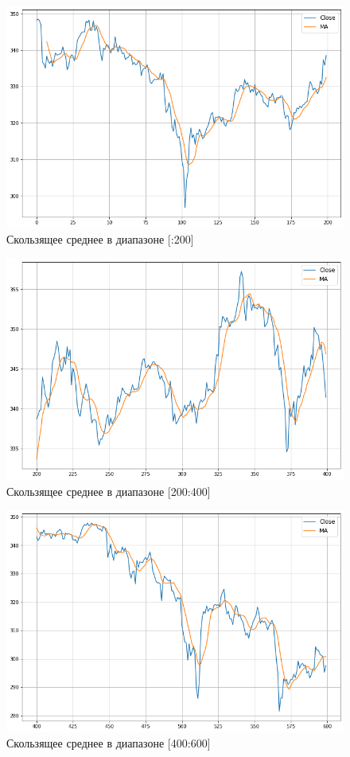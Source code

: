 \documentclass[14pt,a4paper]{extarticle}%
\begin{document}
\begin{figure}[H]
  \centering
  \includegraphics[scale=0.5]{MA_1.png}
  \caption{Скользящее среднее в диапазоне [:200]}
  \label{fig:MA_1}
\end{figure}

\begin{figure}[H]
  \centering
  \includegraphics[scale=0.5]{MA_2.png}
  \caption{Скользящее среднее в диапазоне [200:400]}
  \label{fig:MA_2}
\end{figure}

\begin{figure}[H]
  \centering
  \includegraphics[scale=0.5]{MA_3.png}
  \caption{Скользящее среднее в диапазоне [400:600]}
  \label{fig:MA_3}
\end{figure}
\end{document}
